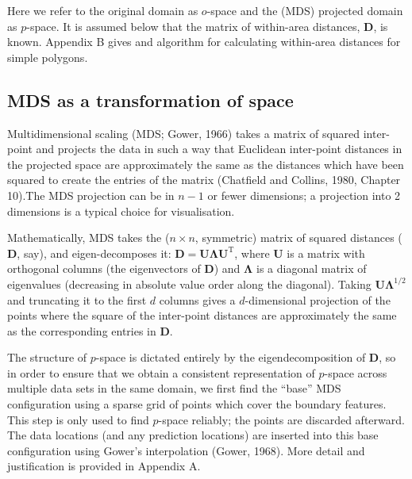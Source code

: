 \documentclass[useAMS, referee]{biom}
\begin{document}
Here we refer to the original domain as $o$-space and the (MDS) projected domain as $p$-space. It is assumed below that the matrix of within-area distances, $\mathbf{D}$, is known. Appendix B gives and algorithm for calculating within-area distances for simple polygons. %

\subsection{MDS as a transformation of space}

Multidimensional scaling (MDS; Gower, 1966) takes a matrix of squared inter-point and projects the data in such a way that Euclidean inter-point distances in the projected space are approximately the same as the distances which have been squared to create the entries of the matrix (Chatfield and Collins, 1980, Chapter 10).The MDS projection can be in $n-1$ or fewer dimensions; a projection into 2 dimensions is a typical choice for visualisation.

Mathematically, MDS takes the ($n\times n$, symmetric) matrix of squared distances ($\mathbf{D}$, say), and eigen-decomposes it: $\mathbf{D}=\mathbf{U}\mathbf{\Lambda}\mathbf{U}^\text{T}$, where $\mathbf{U}$ is a matrix with orthogonal columns (the eigenvectors of  $\mathbf{D}$) and $\mathbf{\Lambda}$ is  a diagonal matrix of eigenvalues (decreasing in absolute value order along the diagonal). Taking $\mathbf{U}\mathbf{\Lambda}^{1/2}$ and truncating it to the first $d$ columns gives a $d$-dimensional projection of the points where the square of the inter-point distances are approximately the same as the corresponding entries in $\mathbf{D}$. %

The structure of $p$-space is dictated entirely by the eigendecomposition of $\mathbf{D}$, so in order to ensure that we obtain a consistent representation of $p$-space across multiple data sets in the same domain, we first find the ``base'' MDS configuration using a sparse grid of points which cover the boundary features. This step is only used to find $p$-space reliably; the points are discarded afterward. The data locations (and any prediction locations) are inserted into this base configuration using Gower's interpolation (Gower, 1968). More detail and justification is provided in Appendix A.
\end{document}
